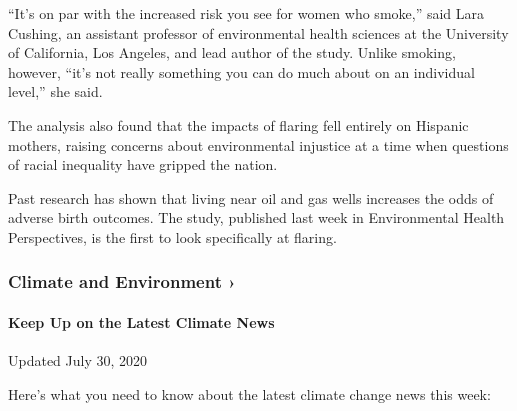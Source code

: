 ``It's on par with the increased risk you see for women who smoke,''
said Lara Cushing, an assistant professor of environmental health
sciences at the University of California, Los Angeles, and lead author
of the study. Unlike smoking, however, ``it's not really something you
can do much about on an individual level,'' she said.

The analysis also found that the impacts of flaring fell entirely on
Hispanic mothers, raising concerns about environmental injustice at a
time when questions of racial inequality have gripped the nation.

Past research has shown that living near oil and gas wells increases the
odds of adverse birth outcomes. The study, published last week in
Environmental Health Perspectives, is the first to look specifically at
flaring.

\href{https://www.nytimes3xbfgragh.onion/section/climate?action=click\&pgtype=Article\&state=default\&region=MAIN_CONTENT_1\&context=storylines_keepup}{}

\hypertarget{climate-and-environment-}{%
\subsubsection{Climate and Environment
›}\label{climate-and-environment-}}

\hypertarget{keep-up-on-the-latest-climate-news}{%
\paragraph{Keep Up on the Latest Climate
News}\label{keep-up-on-the-latest-climate-news}}

Updated July 30, 2020

Here's what you need to know about the latest climate change news this
week:

